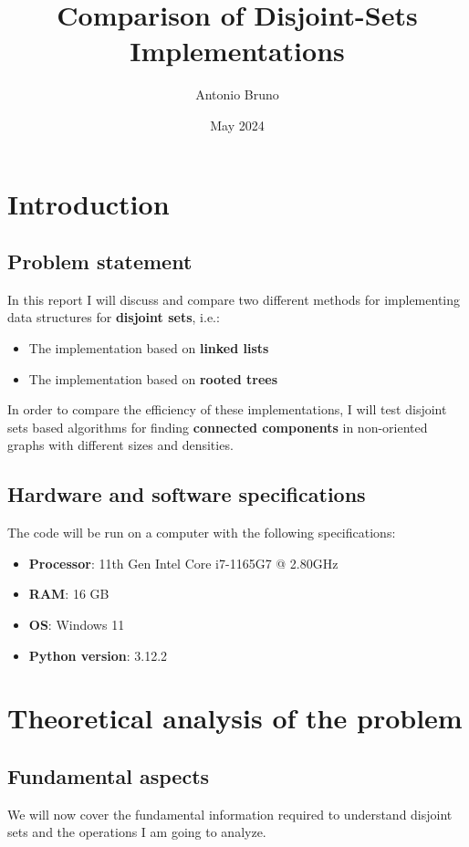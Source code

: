 \documentclass[11pt]{article}
\title{\textbf{Comparison of Disjoint-Sets Implementations}}
\author{Antonio Bruno}
\date{May 2024}
\begin{document}
    \maketitle
    \tableofcontents
    \newpage
    
    \section{Introduction}\label{sec:introduction}

    \subsection{Problem statement}\label{subsec:problem-statement}
    In this report I will discuss and compare two different methods for implementing data structures for \textbf{disjoint sets}, i.e.:
    \begin{itemize}
        \item The implementation based on \textbf{linked lists}
        \item The implementation based on \textbf{rooted trees}
    \end{itemize}
    In order to compare the efficiency of these implementations, I will test disjoint sets based algorithms for finding \textbf{connected components} in non-oriented graphs with different sizes and densities.

    \subsection{Hardware and software specifications}\label{subsec:hardware-and-software-specifications}
    The code will be run on a computer with the following specifications:
    \begin{itemize}
        \item \textbf{Processor}: 11th Gen Intel Core i7-1165G7 @ 2.80GHz
        \item \textbf{RAM}: 16 GB
        \item \textbf{OS}: Windows 11
        \item \textbf{Python version}: 3.12.2
    \end{itemize}

    \section{Theoretical analysis of the problem}\label{sec:theoretical-analysis}
    \subsection{Fundamental aspects}
    We will now cover the fundamental information required to understand disjoint sets and the operations I am going to analyze.
\end{document}
